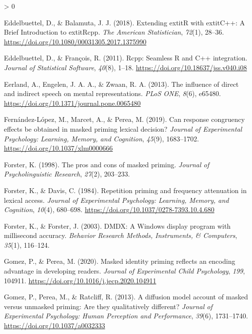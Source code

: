 \documentclass[
  english,
  man,floatsintext]{apa6}
\newlength{\cslhangindent}
\newenvironment{CSLReferences}[2] %
 {%
  \setlength{\parindent}{0pt}
  \ifodd #1 \everypar{\setlength{\hangindent}{\cslhangindent}}\ignorespaces\fi
  \ifnum #2 > 0
  \setlength{\parskip}{#2\baselineskip}
  \fi
 }%
 {}
\begin{document}
\begin{CSLReferences}{1}{0}
\leavevmode\hypertarget{ref-R-Rcpp_b}{}%
Eddelbuettel, D., \& Balamuta, J. J. (2018). {Extending extit{R} with extit{C++}: A Brief Introduction to extit{Rcpp}}. \emph{The American Statistician}, \emph{72}(1), 28--36. \url{https://doi.org/10.1080/00031305.2017.1375990}

\leavevmode\hypertarget{ref-R-Rcpp_a}{}%
Eddelbuettel, D., \& François, R. (2011). {Rcpp}: Seamless {R} and {C++} integration. \emph{Journal of Statistical Software}, \emph{40}(8), 1--18. \url{https://doi.org/10.18637/jss.v040.i08}

\leavevmode\hypertarget{ref-eerland2013influence}{}%
Eerland, A., Engelen, J. A. A., \& Zwaan, R. A. (2013). The influence of direct and indirect speech on mental representations. \emph{{PLoS} {ONE}}, \emph{8}(6), e65480. \url{https://doi.org/10.1371/journal.pone.0065480}

\leavevmode\hypertarget{ref-Fern_ndez_L_pez_2019}{}%
Fernández-López, M., Marcet, A., \& Perea, M. (2019). Can response congruency effects be obtained in masked priming lexical decision? \emph{Journal of Experimental Psychology: Learning, Memory, and Cognition}, \emph{45}(9), 1683--1702. \url{https://doi.org/10.1037/xlm0000666}

\leavevmode\hypertarget{ref-forster1998pros}{}%
Forster, K. (1998). The pros and cons of masked priming. \emph{Journal of Psycholinguistic Research}, \emph{27}(2), 203--233.

\leavevmode\hypertarget{ref-forsterRepetitionPrimingFrequency1984}{}%
Forster, K., \& Davis, C. (1984). Repetition priming and frequency attenuation in lexical access. \emph{Journal of Experimental Psychology: Learning, Memory, and Cognition}, \emph{10}(4), 680--698. \url{https://doi.org/10.1037/0278-7393.10.4.680}

\leavevmode\hypertarget{ref-forsterDMDXWindowsDisplay2003}{}%
Forster, K., \& Forster, J. (2003). {DMDX}: {A Windows} display program with millisecond accuracy. \emph{Behavior Research Methods, Instruments, \& Computers}, \emph{35}(1), 116--124.

\leavevmode\hypertarget{ref-Gomez_2020}{}%
Gomez, P., \& Perea, M. (2020). Masked identity priming reflects an encoding advantage in developing readers. \emph{Journal of Experimental Child Psychology}, \emph{199}, 104911. \url{https://doi.org/10.1016/j.jecp.2020.104911}

\leavevmode\hypertarget{ref-gomezDiffusionModelAccount2013}{}%
Gomez, P., Perea, M., \& Ratcliff, R. (2013). A diffusion model account of masked versus unmasked priming: {Are} they qualitatively different? \emph{Journal of Experimental Psychology: Human Perception and Performance}, \emph{39}(6), 1731--1740. \url{https://doi.org/10.1037/a0032333}


\end{CSLReferences}
\end{document}
